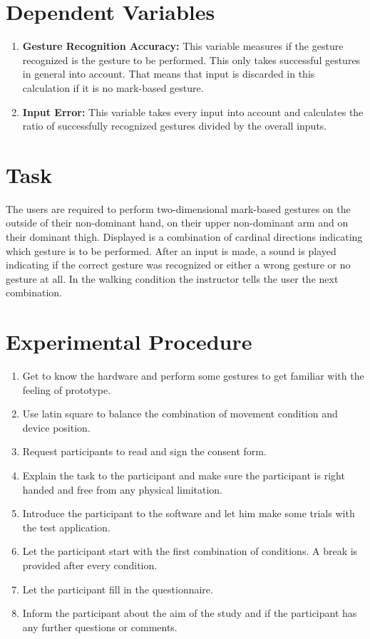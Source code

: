 \documentclass[10pt,a4paper,twocolumn]{article}
\begin{document}
\section*{Dependent Variables}
\begin{enumerate}
\item \textbf{Gesture Recognition Accuracy:} This variable measures if the gesture recognized is the gesture to be performed. This only takes successful gestures in general into account. That means that input is discarded in this calculation if it is no mark-based gesture.
\item \textbf{Input Error:} This variable takes every input into account and calculates the ratio of successfully recognized gestures divided by the overall inputs.
\end{enumerate}

\section*{Task}
The users are required to perform two-dimensional mark-based gestures on the outside of their non-dominant hand, on their upper non-dominant arm and on their dominant thigh. Displayed is a  combination of cardinal directions indicating which gesture is to be performed. After an input is made, a sound is played indicating if the correct gesture was recognized or either a wrong gesture or no gesture at all. In the walking condition the instructor tells the user the next combination. 

\section*{Experimental Procedure}
\begin{enumerate}
\item Get to know the hardware and perform some gestures to get familiar with the feeling of prototype.
\item Use latin square to balance the combination of movement condition and device position.
\item Request participants to read and sign the consent form.
\item Explain the task to the participant and make sure the participant is right handed and free from any physical limitation.
\item Introduce the participant to the software and let him make some trials with the test application.
\item Let the participant start with the first combination of conditions. A break is provided after every condition. 
\item Let the participant fill in the questionnaire.
\item Inform the participant about the aim of the study and if the participant has any further questions or comments.
\end{enumerate}
\end{document}
